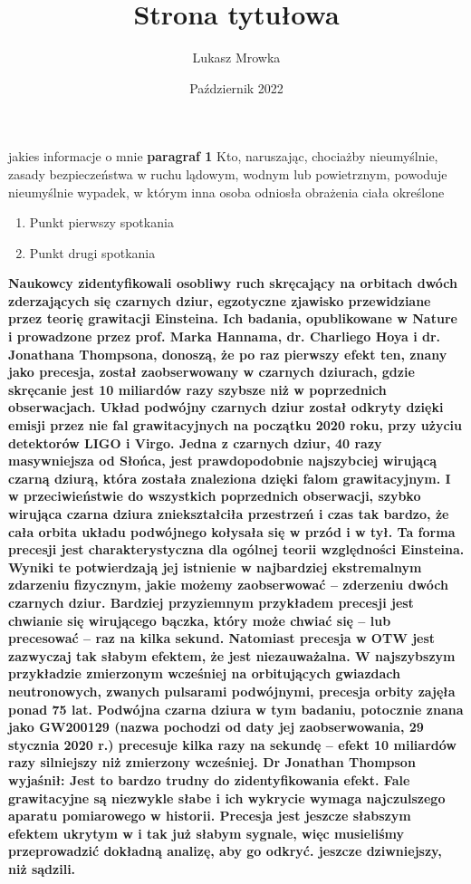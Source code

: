 \documentclass[a4paper]{article}
\title{Strona tytułowa}
\author{Lukasz Mrowka}
\date{Październik 2022}
\begin{document}
\maketitle
jakies informacje o mnie
\newpage
\textbf{paragraf 1}
Kto, naruszając, chociażby nieumyślnie, zasady bezpieczeństwa w ruchu lądowym, wodnym lub powietrznym, powoduje nieumyślnie wypadek, w którym inna osoba odniosła obrażenia ciała określone 
\newline
\begin{enumerate}
\item Punkt pierwszy spotkania
\item Punkt drugi spotkania
\end{enumerate}
\textbf{Naukowcy zidentyfikowali osobliwy ruch skręcający na orbitach dwóch zderzających się czarnych dziur, egzotyczne zjawisko przewidziane przez teorię grawitacji Einsteina.
Ich badania, opublikowane w Nature i prowadzone przez prof. Marka Hannama, dr. Charliego Hoya i dr. Jonathana Thompsona, donoszą, że po raz pierwszy efekt ten, znany jako precesja, został zaobserwowany w czarnych dziurach, gdzie skręcanie jest 10 miliardów razy szybsze niż w poprzednich obserwacjach.
Układ podwójny czarnych dziur został odkryty dzięki emisji przez nie fal grawitacyjnych na początku 2020 roku, przy użyciu detektorów LIGO i Virgo. Jedna z czarnych dziur, 40 razy masywniejsza od Słońca, jest prawdopodobnie najszybciej wirującą czarną dziurą, która została znaleziona dzięki falom grawitacyjnym. I w przeciwieństwie do wszystkich poprzednich obserwacji, szybko wirująca czarna dziura zniekształciła przestrzeń i czas tak bardzo, że cała orbita układu podwójnego kołysała się w przód i w tył.
Ta forma precesji jest charakterystyczna dla ogólnej teorii względności Einsteina. Wyniki te potwierdzają jej istnienie w najbardziej ekstremalnym zdarzeniu fizycznym, jakie możemy zaobserwować – zderzeniu dwóch czarnych dziur.
Bardziej przyziemnym przykładem precesji jest chwianie się wirującego bączka, który może chwiać się – lub precesować – raz na kilka sekund. Natomiast precesja w OTW jest zazwyczaj tak słabym efektem, że jest niezauważalna. W najszybszym przykładzie zmierzonym wcześniej na orbitujących gwiazdach neutronowych, zwanych pulsarami podwójnymi, precesja orbity zajęła ponad 75 lat. Podwójna czarna dziura w tym badaniu, potocznie znana jako GW200129 (nazwa pochodzi od daty jej zaobserwowania, 29 stycznia 2020 r.) precesuje kilka razy na sekundę – efekt 10 miliardów razy silniejszy niż zmierzony wcześniej.
Dr Jonathan Thompson wyjaśnił: Jest to bardzo trudny do zidentyfikowania efekt. Fale grawitacyjne są niezwykle słabe i ich wykrycie wymaga najczulszego aparatu pomiarowego w historii. Precesja jest jeszcze słabszym efektem ukrytym w i tak już słabym sygnale, więc musieliśmy przeprowadzić dokładną analizę, aby go odkryć.
 jeszcze dziwniejszy, niż sądzili.}
\end{document}
